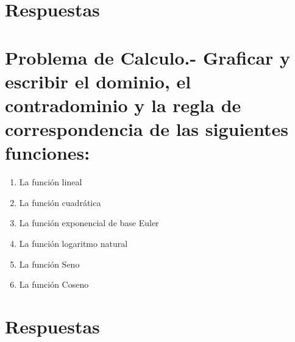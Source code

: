 \documentclass{article} %
\begin{document}
\section*{Respuestas}


\section*{Problema de Calculo.- Graficar y escribir el dominio,
el contradominio y la regla de correspondencia de las
siguientes funciones:}

\begin{enumerate}
    \item La función lineal
    \item La función cuadrática
    \item La función exponencial de base Euler
    \item La función logaritmo natural
    \item La función Seno
    \item La función Coseno
\end{enumerate}

\section*{Respuestas}
\end{document}
